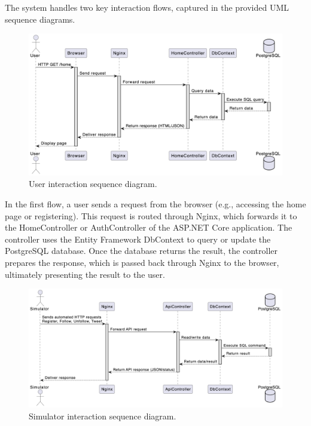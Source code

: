 \documentclass[12pt,a4paper,reqno]{report}
\begin{document}
The system handles two key interaction flows, captured in the provided UML sequence diagrams.

\begin{figure}[h!]
    \centering
    \includegraphics[width=\textwidth]{images/user-interaction-uml.png}
    \caption{User interaction sequence diagram.}
    \label{fig:minitwit-diagram}
\end{figure}

In the first flow, a user sends a request from the browser (e.g., accessing the home page or registering). This request is routed through Nginx, which forwards it to the HomeController or AuthController of the ASP.NET Core application. The controller uses the Entity Framework DbContext to query or update the PostgreSQL database. Once the database returns the result, the controller prepares the response, which is passed back through Nginx to the browser, ultimately presenting the result to the user.

\begin{figure}[h!]
    \centering
    \includegraphics[width=\textwidth]{images/simulator-interaction-uml.png}
    \caption{Simulator interaction sequence diagram.}
    \label{fig:minitwit-diagram}
\end{figure}
\end{document}
